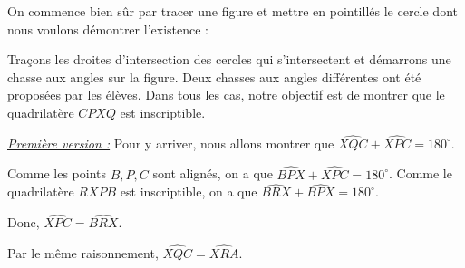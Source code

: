 \begin{sol}
On commence bien sûr par tracer une figure et mettre en pointillés le cercle dont nous voulons démontrer l'existence :
\begin{figure}[H]
\end{figure}
Traçons les droites d'intersection des cercles qui s'intersectent et démarrons une chasse aux angles sur la figure. Deux chasses aux angles différentes ont été proposées par les élèves. Dans tous les cas, notre objectif est de montrer que le quadrilatère $CPXQ$ est inscriptible.

\underline{\textit{Première version :}} Pour y arriver, nous allons montrer que $\widehat{XQC}+\widehat{XPC}=180^\circ$.
\begin{figure}[H]
\end{figure}
Comme les points $B,P,C$ sont alignés, on a que $\widehat{BPX}+\widehat{XPC}=180^\circ$. Comme le quadrilatère $RXPB$ est inscriptible, on a que $\widehat{BRX}+\widehat{BPX}=180^\circ$.

Donc, $\widehat{XPC}=\widehat{BRX}$.

Par le même raisonnement, $\widehat{XQC}=\widehat{XRA}$.


\end{sol}
